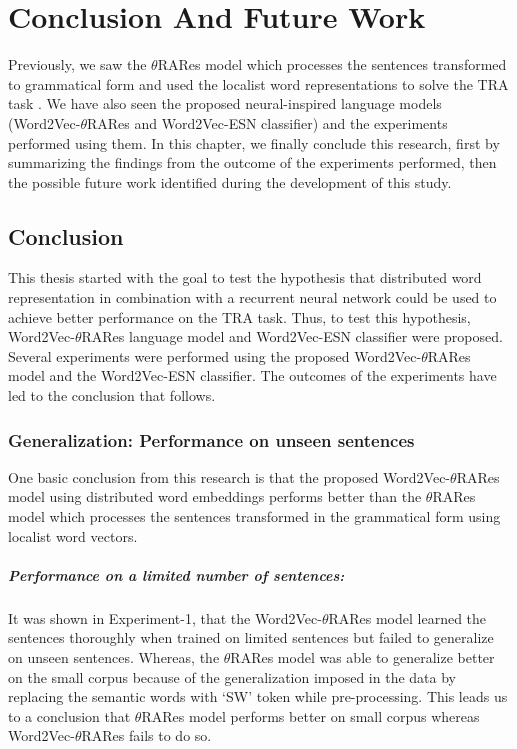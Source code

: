\chapter{Conclusion And Future Work}\label{conclusion}

Previously, we saw the $\theta$RARes model which processes the sentences transformed to grammatical form and used the localist word representations to solve the TRA task \cite{xavier:2013:RT}. We have also seen the proposed neural-inspired language models (Word2Vec-$\theta$RARes and Word2Vec-ESN classifier) and the experiments performed using them. In this chapter, we finally conclude this research, first by summarizing the findings from the outcome of the experiments performed, then the possible future work identified during the development of this study.

\section{Conclusion}

This thesis started with the goal to test the hypothesis that distributed word representation in combination with a recurrent neural network could be used to achieve better performance on the TRA task. Thus, to test this hypothesis, Word2Vec-$\theta$RARes language model and Word2Vec-ESN classifier were proposed. Several experiments were performed using the proposed Word2Vec-$\theta$RARes model and the Word2Vec-ESN classifier. The outcomes of the experiments have led to the conclusion that follows.

\subsection{Generalization: Performance on unseen sentences}

One basic conclusion from this research is that the proposed Word2Vec-$\theta$RARes model using distributed word embeddings performs better than the $\theta$RARes model which processes the sentences transformed in the grammatical form using localist word vectors.

\paragraph{Performance on a limited number of sentences:} It was shown in Experiment-1, that the Word2Vec-$\theta$RARes model learned the sentences thoroughly when trained on limited sentences but failed to generalize on unseen sentences. Whereas, the  $\theta$RARes model was able to generalize better on the small corpus because of the generalization imposed in the data by replacing the semantic words with `SW' token while pre-processing. This leads us to a conclusion that $\theta$RARes model performs better on small corpus whereas Word2Vec-$\theta$RARes fails to do so. 

